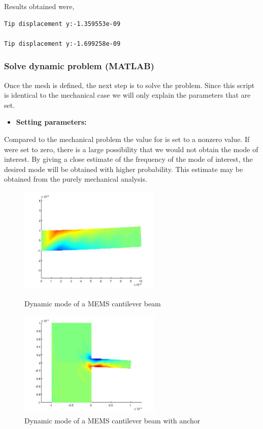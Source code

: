 Results obtained were,
\begin{verbatim}
Tip displacement y:-1.359553e-09

Tip displacement y:-1.699258e-09
\end{verbatim}

\clearpage
\subsubsection*{Solve dynamic problem (MATLAB)}
Once the mesh is defined, the next step is to solve the problem.
Since this script is identical to the mechanical case we will only 
explain the parameters that are set.
\begin{itemize}

  \item{\textbf{Setting parameters:}}

\end{itemize}
Compared to the mechanical problem the value for  is set to a
nonzero value. If  were set to zero, there is a large possibility
that we would not obtain the mode of interest. By giving a close estimate
of the frequency of the mode of interest, the desired mode will be 
obtained with higher probability. This estimate  may be obtained
from the purely mechanical analysis.

\begin{figure}
\centering
\includegraphics[height = 2in]{fig/mems_cant_te_dyn.jpg}
\caption{Dynamic mode of a MEMS cantilever beam}
\label{fig:MEMSCantileverBeamTEDynamic}
\includegraphics[height = 2in]{fig/mems_cant_wa_te_dyn.jpg}
\caption{Dynamic mode of a MEMS cantilever beam with anchor}
\label{fig:MEMSCantileverBeamWaTEDynamic}
\end{figure}

